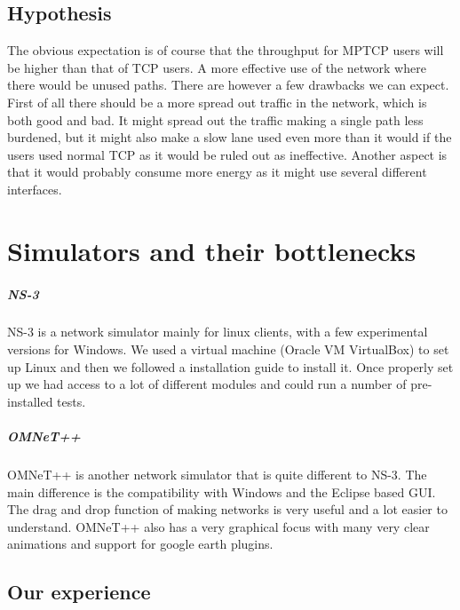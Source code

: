 \documentclass[11pt,twocolumn]{article}
\begin{document}
\subsection{Hypothesis}

The obvious expectation is of course that the throughput for MPTCP users will be higher than that of TCP users. A more effective use of the network where there would be unused paths. There are however a few drawbacks we can expect. First of all there should be a more spread out traffic in the network, which is both good and bad. It might spread out the traffic making a single path less burdened, but it might also make a slow lane used even more than it would if the users used normal TCP as it would be ruled out as ineffective. Another aspect is that it would probably consume more energy as it might use several different interfaces. 



\section{Simulators and their bottlenecks}

\subparagraph{NS-3}

NS-3 is a network simulator mainly for linux clients, with a few experimental versions for Windows. We used a virtual machine (Oracle VM VirtualBox) to set up Linux and then we followed a installation guide\cite{Guide} to install it. Once properly set up we had access to a lot of different modules and could run a number of pre-installed tests. 

\subparagraph{OMNeT++}

OMNeT++ is another network simulator that is quite different to NS-3. The main difference is the compatibility with Windows and the Eclipse based GUI. The drag and drop function of making networks is very useful and a lot easier to understand. OMNeT++ also has a very graphical focus with many very clear animations and support for google earth plugins.

\subsection{Our experience}
\end{document}
